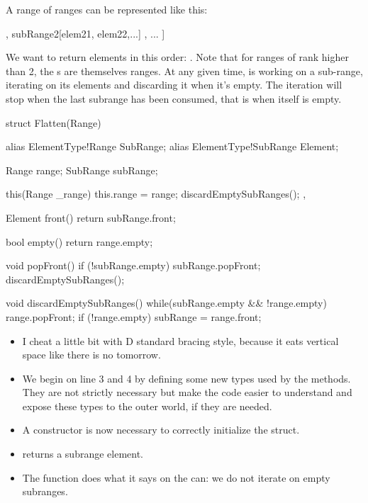 A range of ranges can be represented like this:

\begin{dcode}
[ subRange1[elem11, elem12,...]
, subRange2[elem21, elem22,...] 
, ... ]
\end{dcode}

We want  to return elements in this order: . Note that for ranges of rank higher than 2, the s are themselves ranges. At any given time,  is working on a sub-range, iterating on its elements and discarding it when it's empty. The iteration will stop when the last subrange has been consumed, that is when  itself is empty.

\begin{dcode}
struct Flatten(Range)
{
    alias ElementType!Range    SubRange;
    alias ElementType!SubRange Element;

    Range range;
    SubRange subRange;

    this(Range _range) {
        this.range = range;
        discardEmptySubRanges();
    },

    Element front() { return subRange.front;}

    bool empty() { return range.empty;}

    void popFront() {
        if (!subRange.empty) subRange.popFront;
        discardEmptySubRanges();
    }

    void discardEmptySubRanges() {
        while(subRange.empty && !range.empty) {
            range.popFront;
            if (!range.empty) subRange = range.front;
        }
    }
}
\end{dcode}

\begin{itemize}
\item I cheat a little bit with D standard bracing style, because it eats vertical space like there is no tomorrow.
\item We begin on line 3 and 4 by defining some new types used by the methods. They are not strictly necessary but make the code easier to understand and expose these types to the outer world, if they are needed.
\item A constructor is now necessary to correctly initialize the struct.
\item {} returns a subrange element.
\item The  function does what it says on the can: we do not iterate on empty subranges.
\end{itemize}

